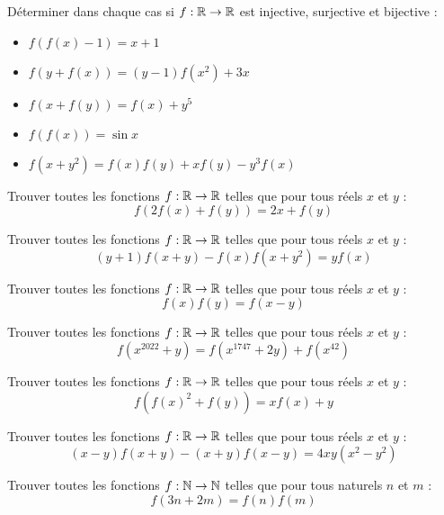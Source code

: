 \begin{exo}
Déterminer dans chaque cas si $f:\mathbb R\to\mathbb R$ est injective, surjective et bijective :
\begin{itemize}
    \item $f(f(x)-1)=x+1$
    \item $f(y+f(x))=(y-1)f(x^2)+3x$
    \item $f(x+f(y))=f(x)+y^5$
    \item $f(f(x))=\sin x$
    \item $f(x+y^2)=f(x)f(y)+xf(y)-y^3f(x)$
\end{itemize}
\end{exo}




\begin{exo}
Trouver toutes les fonctions $f:\mathbb R\to\mathbb R$ telles que pour tous réels $x$ et $y$ :
$$f(2f(x)+f(y))=2x+f(y)$$
\end{exo}


\begin{exo}
Trouver toutes les fonctions $f:\mathbb R\to\mathbb R$ telles que pour tous réels $x$ et $y$ :
$$(y+1)f(x+y)-f(x)f(x+y^2)=yf(x)$$
\end{exo}


\begin{exo}
Trouver toutes les fonctions $f:\mathbb R\to\mathbb R$ telles que pour tous réels $x$ et $y$ :
$$f(x)f(y)=f(x-y)$$
\end{exo}


\begin{exo}
Trouver toutes les fonctions $f:\mathbb R\to\mathbb R$ telles que pour tous réels $x$ et $y$ :
$$f(x^{2022}+y)=f(x^{1747}+2y)+f(x^{42})$$
\end{exo}


\begin{exo}
Trouver toutes les fonctions $f:\mathbb R\to\mathbb R$ telles que pour tous réels $x$ et $y$ :
$$f(f(x)^2+f(y))=xf(x)+y$$
\end{exo}


\begin{exo}
Trouver toutes les fonctions $f:\mathbb R\to\mathbb R$ telles que pour tous réels $x$ et $y$ :
$$(x-y)f(x+y)-(x+y)f(x-y)=4xy(x^2-y^2)$$
\end{exo}


\begin{exo}
Trouver toutes les fonctions $f:\mathbb N\to\mathbb N$ telles que pour tous naturels $n$ et $m$ :
$$f(3n+2m)=f(n)f(m)$$
\end{exo}


